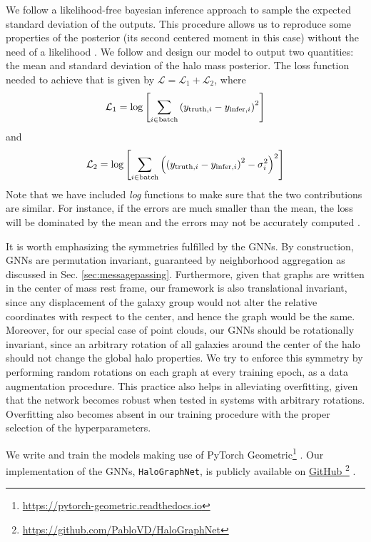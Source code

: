 \documentclass[twocolumn]{aastex631}
\begin{document}
We follow a likelihood-free bayesian inference approach to sample the expected standard deviation of the outputs. This procedure allows us to reproduce some properties of the posterior (its second centered moment in this case) without the need of a likelihood \citep{Jeffrey:2020xve}. We follow \citet{moment_networks} and design our model to output two quantities: the mean and standard deviation of the halo mass posterior. The loss function needed to achieve that is given by  $\mathcal{L}=\mathcal{L}_1+\mathcal{L}_2$, where
\begin{equation}
    \mathcal{L}_1=\log\left[\sum_{i\in{\rm batch}}\left(y_{{\rm truth}, i} - y_{{\rm infer}, i}\right)^2\right]
\end{equation}
and
\begin{equation}
    \mathcal{L}_2=\log\left[\sum_{i\in{\rm batch}}\left(\left(y_{{\rm truth}, i} - y_{{\rm infer}, i}\right)^2 - \sigma_{i}^2 \right)^2\right]
    \label{eq:loss2}
\end{equation}
Note that we have included \textit{log} functions to make sure that the two contributions are similar. For instance, if the errors are much smaller than the mean, the loss will be dominated by the mean and the errors may not be accurately computed \citep[see][for further details]{2021arXiv210910915V}.

It is worth emphasizing the symmetries fulfilled by the GNNs. By construction, GNNs are permutation invariant, guaranteed by neighborhood aggregation as discussed in Sec. \ref{sec:messagepassing}. Furthermore, given that graphs are written in the center of mass rest frame, our framework is also translational invariant, since any displacement of the galaxy group would not alter the relative coordinates with respect to the center, and hence the graph would be the same. Moreover, for our special case of point clouds, our GNNs should be rotationally invariant, since an arbitrary rotation of all galaxies around the center of the halo should not change the global halo properties. We try to enforce this symmetry by performing random rotations on each graph at every training epoch, as a data augmentation procedure. This practice also helps in alleviating overfitting, given that the network becomes robust when tested in systems with arbitrary rotations. Overfitting also becomes absent in our training procedure with the proper selection of the hyperparameters.

We write and train the models making use of PyTorch Geometric\footnote{\url{https://pytorch-geometric.readthedocs.io}} \citep{Fey_Fast_Graph_Representation_2019}. Our implementation of the GNNs, {\tt HaloGraphNet}, is publicly available on \href{https://github.com/PabloVD/HaloGraphNet}{GitHub }\footnote{\url{https://github.com/PabloVD/HaloGraphNet}} \citep{HaloGraphNet}.
\end{document}
